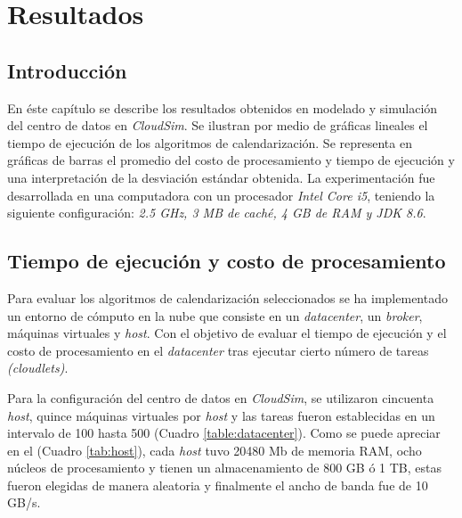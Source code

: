 \chead{}
\rhead{\thepage}


\chapter{Resultados}
\section*{Introducci\'on}

En éste capítulo se describe los resultados obtenidos en modelado y simulación del centro de datos en \textit{CloudSim}. 
Se ilustran por medio de gráficas lineales el tiempo de ejecución de los algoritmos de calendarización. Se representa en gráficas de barras el promedio del costo de procesamiento y tiempo de ejecución y una interpretación de la desviación estándar obtenida. La experimentación fue desarrollada en una computadora con un procesador \textit{Intel Core i5}, teniendo la siguiente configuración: \textit{2.5 GHz, 3 MB de cach\'e, 4 GB de RAM y JDK 8.6}.






\vspace{20em} 

\section{Tiempo de ejecuci\'on y costo de procesamiento}


Para evaluar los algoritmos de calendarizaci\'on seleccionados se ha implementado un entorno de c\'omputo en la nube que consiste en un \textit{datacenter}, un \textit{broker}, m\'aquinas virtuales y \textit{host}.  Con el objetivo de evaluar el tiempo de ejecuci\'on y el costo de procesamiento en el \textit{datacenter} tras ejecutar cierto n\'umero de tareas \textit{(cloudlets)}.

Para la configuraci\'on del centro de datos en \textit{CloudSim}, se utilizaron cincuenta \textit{host}, quince m\'aquinas virtuales por \textit{host} y las tareas fueron establecidas en un intervalo de 100 hasta 500 (Cuadro \ref{table:datacenter}).
Como se puede apreciar en el (Cuadro \ref{tab:host}), cada \textit{host} tuvo 20480 Mb de memoria RAM, ocho n\'ucleos de procesamiento y tienen un almacenamiento de 800 GB \'o 1 TB, estas fueron elegidas de manera aleatoria y finalmente el ancho de banda fue de 10 GB/s.

